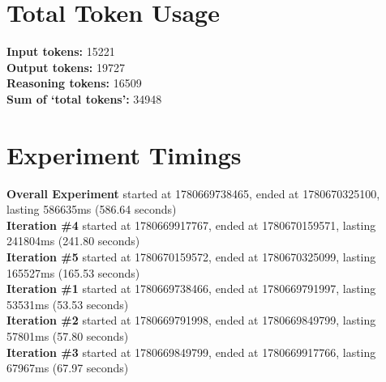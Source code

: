 \documentclass{article}
\begin{document}
\section*{Total Token Usage}
\textbf{Input tokens: }15221
\\\textbf{Output tokens: }19727
\\\textbf{Reasoning tokens: }16509
\\\textbf{Sum of `total tokens': }34948
\section*{Experiment Timings}
\textbf{Overall Experiment} started at 1780669738465, ended at 1780670325100, lasting 586635ms (586.64 seconds)
\\\textbf{Iteration \#4} started at 1780669917767, ended at 1780670159571, lasting 241804ms (241.80 seconds)
\\\textbf{Iteration \#5} started at 1780670159572, ended at 1780670325099, lasting 165527ms (165.53 seconds)
\\\textbf{Iteration \#1} started at 1780669738466, ended at 1780669791997, lasting 53531ms (53.53 seconds)
\\\textbf{Iteration \#2} started at 1780669791998, ended at 1780669849799, lasting 57801ms (57.80 seconds)
\\\textbf{Iteration \#3} started at 1780669849799, ended at 1780669917766, lasting 67967ms (67.97 seconds)
\end{document}

